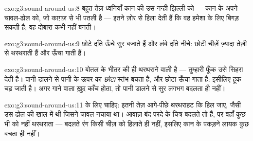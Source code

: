 \begin{solution}{exo:g3:sound-around-us:8}
बहुत तेज़ ध्वनियाँ कान की उस नन्ही झिल्ली को --- कान के अपने
चावल-ढोल को, जो काग़ज़ से भी पतली है --- इतने ज़ोर से हिला देती हैं
कि वह हमेशा के लिए बिगड़ सकती है; वह दोबारा कभी नहीं बनती।
\end{solution}

\begin{solution}{exo:g3:sound-around-us:9}
छोटे दाँते ऊँचे सुर बजाते हैं और लंबे दाँते नीचे: छोटी चीज़ें
ज़्यादा तेज़ी से थरथराती हैं और ऊँचा गाती हैं।
\end{solution}

\begin{solution}{exo:g3:sound-around-us:10}
बोतल के भीतर की  ही थरथराने वाली है --- तुम्हारी फूँक उसे सिहरा
देती है। पानी डालने से पानी के ऊपर  का \emph{छोटा} स्तंभ बचता है,
और छोटा ऊँचा गाता है: इसीलिए हूक चढ़ जाती है। अगर गाने वाला ख़ुद
काँच होता, तो पानी डालने से सुर लगभग बदलता ही नहीं।
\end{solution}

\begin{solution}{exo:g3:sound-around-us:11}
 के लिए \emph{} चाहिए: इतनी तेज़ आगे-पीछे थरथराहट कि  हिल
जाए, जैसी उस ढोल की खाल में थी जिसने चावल नचाया था। आवाज़ बंद परदे के
चित्र बदलते तो हैं, पर वहाँ कुछ भी  को नहीं थरथराता --- बदलते रंग
किसी चीज़ को हिलाते ही नहीं, इसलिए कान के पकड़ने लायक कुछ बचता ही
नहीं।
\end{solution}
